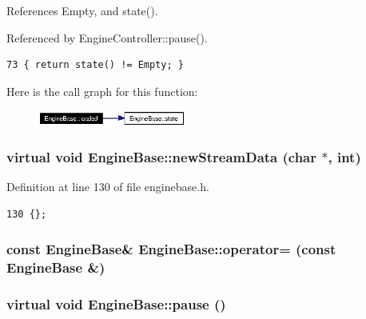 References Empty, and state().

Referenced by Engine\-Controller::pause().



\footnotesize\begin{verbatim}73 { return state() != Empty; }
\end{verbatim}\normalsize 


Here is the call graph for this function:\begin{figure}[H]
\begin{center}
\leavevmode
\includegraphics[width=138pt]{classEngineBase_EngineBasea9_cgraph}
\end{center}
\end{figure}
\subsubsection{\setlength{\rightskip}{0pt plus 5cm}virtual void Engine\-Base::new\-Stream\-Data (char $\ast$, int)\hspace{0.3cm}{\tt  [inline, virtual, slot]}}\label{classEngineBase_EngineBasei7}




Definition at line 130 of file enginebase.h.



\footnotesize\begin{verbatim}130 {};
\end{verbatim}\normalsize 
{}
\subsubsection{\setlength{\rightskip}{0pt plus 5cm}const {\bf Engine\-Base}\& Engine\-Base::operator= (const {\bf Engine\-Base} \&)\hspace{0.3cm}{\tt  [protected]}}\label{classEngineBase_EngineBaseb4}


\subsubsection{\setlength{\rightskip}{0pt plus 5cm}virtual void Engine\-Base::pause ()\hspace{0.3cm}{\tt  [pure virtual, slot]}}\label{classEngineBase_EngineBasei3}





